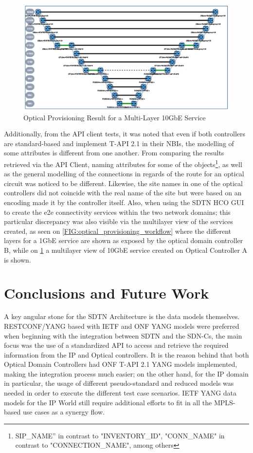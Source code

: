 \documentclass[a4paper,fleqn]{cas-dc}
\begin{document}
\begin{figure}
	\centering
		\includegraphics[width=\linewidth]{figs/optical_provisioning_result.png}
	\caption{Optical Provisioning Result for a Multi-Layer 10GbE Service}
	\label{FIG:optical_provisioning_result}
\end{figure}

Additionally, from the API client tests, it was noted that even if both controllers are standard-based and implement T-API 2.1 in their NBIs, the modelling of some attributes is different from one another. From comparing the results retrieved via the API Client, naming attributes for some of the objects\footnote{SIP\_NAME” in contrast to "INVENTORY\_ID", "CONN\_NAME" in contrast to "CONNECTION\_NAME", among others}, as well as the general modelling of the connections in regards of the route for an optical circuit was noticed to be different. Likewise, the site names in one of the optical controllers did not coincide with the real name of the site but were based on an encoding made it by the controller itself. Also, when using the SDTN HCO GUI to create the e2e connectivity services within the two network domains; this particular discrepancy was also visible via the multilayer view of the services created, as seen on \cref{FIG:optical_provisioning_workflow} where the different layers for a 1GbE service are shown as exposed by the optical domain controller B, while on \cref{FIG:optical_provisioning_result} a multilayer view of 10GbE service created on Optical Controller A is shown.


\section{Conclusions and Future Work}
\label{section:conclusions}
A key angular stone for the SDTN Architecture is the data models themselves. RESTCONF/YANG based with IETF and ONF YANG models were preferred when beginning with the integration between SDTN and the SDN-Cs, the main focus was the use of a standardized API to access and retrieve the required information from the IP and Optical controllers. It is the reason behind that both Optical Domain Controllers had ONF T-API 2.1 YANG models implemented, making the integration process much easier; on the other hand, for the IP domain in particular, the usage of different pseudo-standard and reduced models was needed in order to execute the different test case scenarios. IETF YANG data models for the IP World still require additional efforts to fit in all the MPLS-based use cases as a synergy flow. 
\end{document}
